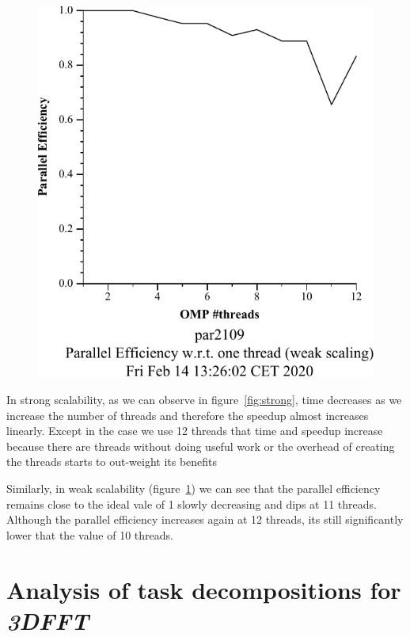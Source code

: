 \begin{figure}[H]
\begin{minipage}{.5\textwidth}
  \includegraphics[width=.7\linewidth]{./data/pi/pi_omp-100000000-1-12-3-weak-boada-3.pdf}
  \label{fig:weak}
\end{minipage}
\end{figure}

In strong scalability, as we can observe in figure~\ref{fig:strong}, time decreases as we increase the number of threads and therefore the speedup almost increases linearly. Except in the case we use 12 threads that time and speedup increase because there are threads without doing useful work or the overhead of creating the threads starts to out-weight its benefits



Similarly, in weak scalability (figure~\ref{fig:weak}) we can see that the parallel efficiency remains close to the ideal vale of 1 slowly decreasing and dips at 11 threads. Although the parallel efficiency increases again at 12 threads,
its still significantly lower that the value of 10 threads.


\section{Analysis of task decompositions for \emph{3DFFT}}%
\label{sec:analysis_of_task_decompositions_for_3dfft}


